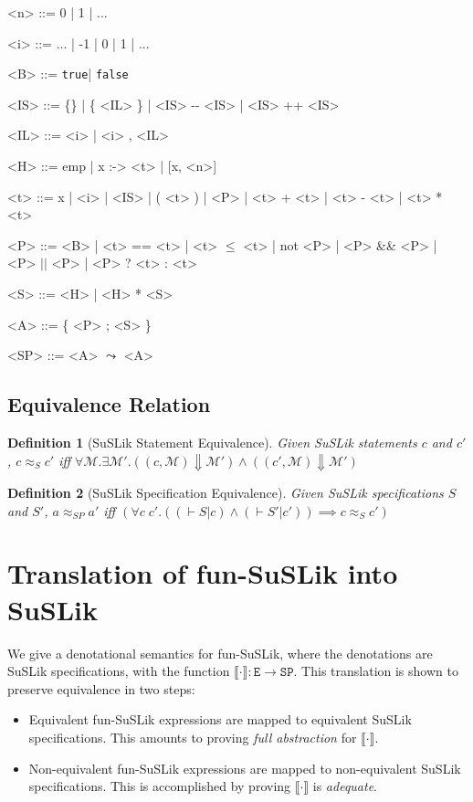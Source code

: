 \documentclass[10pt]{article}
\newtheorem{definition}{Definition}
\newcommand{\ttt}[1]{\texttt{#1}}
\newcommand{\ra}{\ensuremath{\rightarrow}}
\newcommand{\BigStep}{\ensuremath{\Downarrow}}
\newcommand{\true}{\ttt{true}}
\newcommand{\false}{\ttt{false}}
\newcommand{\sem} [1] {\llbracket#1\rrbracket}
\begin{document}
\begin{grammar}
  <n> ::= 0 | 1 | ...

  <i> ::= ... | -1 | 0 | 1 | ...

  <B> ::= \true | \false

  <IS> ::= \{\} | \{ <IL> \} | <IS> -{}- <IS> | <IS> ++ <IS>

  <IL> ::= <i> | <i> , <IL>

  <H> ::= emp | x :-> <t> | [x, <n>]

  <t> ::= x | <i> | <IS> | ( <t> ) | <P> | <t> + <t> | <t> - <t> | <t> * <t>

  <P> ::= <B> | <t> == <t> | <t> $\le$ <t> | not <P> | <P> \&\& <P> | <P> $||$ <P> | <P> ? <t> : <t>

  <S> ::= <H> | <H> * <S>

  <A> ::= \{ <P> ; <S> \}

  <SP> ::= <A> $\leadsto$ <A>
\end{grammar}

\subsection{Equivalence Relation}
\label{sec:SuSLikEquiv}

\begin{definition}[SuSLik Statement Equivalence]
  Given SuSLik statements $c$ and $c'$, $c \approx_S c'$ iff
    $\forall \mathcal{M}. \exists \mathcal{M'}.
      ((c, \mathcal{M}) \BigStep \mathcal{M'})
      \land
      ((c', \mathcal{M}) \BigStep \mathcal{M'})$
\end{definition}

\begin{definition}[SuSLik Specification Equivalence]
  Given SuSLik specifications $S$ and $S'$, $a \approx_{SP} a'$ iff
    $(\forall c\; c'. ((\vdash S | c) \land (\vdash S' | c')) \implies c \approx_{S} c')$
\end{definition}

\section{Translation of fun-SuSLik into SuSLik}
\label{sec:Translation}

We give a denotational semantics for fun-SuSLik, where the denotations are SuSLik specifications, with
the function $\sem{\cdot} : \ttt{E} \ra \ttt{SP}$.
This translation is shown to preserve equivalence in two steps:

\begin{itemize}
  \item Equivalent fun-SuSLik expressions are mapped to equivalent SuSLik specifications. This amounts to proving
    \textit{full abstraction} for $\sem{\cdot}$.
  \item Non-equivalent fun-SuSLik expressions are mapped to non-equivalent SuSLik specifications.
    This is accomplished by proving $\sem{\cdot}$ is \textit{adequate}.
\end{itemize}
\end{document}
